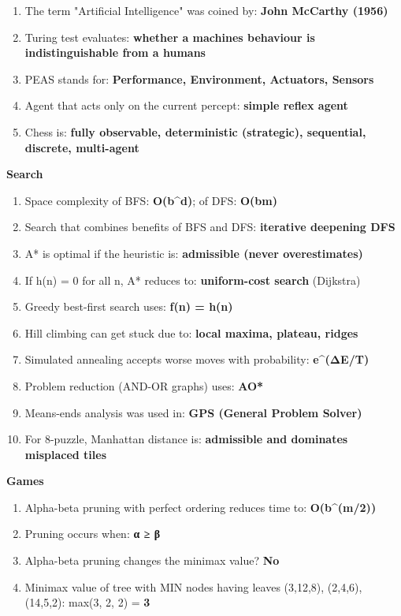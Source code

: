 \begin{enumerate}
\def\labelenumi{\arabic{enumi}.}
\tightlist
\item
  The term "Artificial Intelligence" was coined by: \textbf{John McCarthy (1956)}
\item
  Turing test evaluates: \textbf{whether a machine\textquotesingle s behaviour is indistinguishable from a human\textquotesingle s}
\item
  PEAS stands for: \textbf{Performance, Environment, Actuators, Sensors}
\item
  Agent that acts only on the current percept: \textbf{simple reflex agent}
\item
  Chess is: \textbf{fully observable, deterministic (strategic), sequential, discrete, multi-agent}
\end{enumerate}

\textbf{Search}

\begin{enumerate}
\def\labelenumi{\arabic{enumi}.}
\setcounter{enumi}{5}
\tightlist
\item
  Space complexity of BFS: \textbf{O(b\^{}d)}; of DFS: \textbf{O(bm)}
\item
  Search that combines benefits of BFS and DFS: \textbf{iterative deepening DFS}
\item
  A* is optimal if the heuristic is: \textbf{admissible (never overestimates)}
\item
  If h(n) = 0 for all n, A* reduces to: \textbf{uniform-cost search} (Dijkstra)
\item
  Greedy best-first search uses: \textbf{f(n) = h(n)}
\item
  Hill climbing can get stuck due to: \textbf{local maxima, plateau, ridges}
\item
  Simulated annealing accepts worse moves with probability: \textbf{e\^{}(ΔE/T)}
\item
  Problem reduction (AND-OR graphs) uses: \textbf{AO*}
\item
  Means-ends analysis was used in: \textbf{GPS (General Problem Solver)}
\item
  For 8-puzzle, Manhattan distance is: \textbf{admissible and dominates misplaced tiles}
\end{enumerate}

\textbf{Games}

\begin{enumerate}
\def\labelenumi{\arabic{enumi}.}
\setcounter{enumi}{15}
\tightlist
\item
  Alpha-beta pruning with perfect ordering reduces time to: \textbf{O(b\^{}(m/2))}
\item
  Pruning occurs when: \textbf{α ≥ β}
\item
  Alpha-beta pruning changes the minimax value? \textbf{No}
\item
  Minimax value of tree with MIN nodes having leaves (3,12,8), (2,4,6), (14,5,2): max(3, 2, 2) = \textbf{3}
\end{enumerate}

